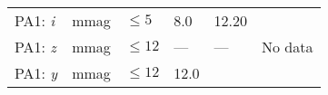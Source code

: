 \documentclass[DM,toc]{lsstdoc}
\begin{document}
\begin{longtable}[]{@{}llllll@{}}
\begin{minipage}[t]{0.14\columnwidth}
PA1: \emph{i}\strut
\end{minipage} & \begin{minipage}[t]{0.06\columnwidth}\raggedright\strut
mmag\strut
\end{minipage} & \begin{minipage}[t]{0.17\columnwidth}\raggedright\strut
\(\leq 5\)\strut
\end{minipage} & \begin{minipage}[t]{0.17\columnwidth}\raggedright\strut
8.0\strut
\end{minipage} & \begin{minipage}[t]{0.12\columnwidth}\raggedright\strut
12.20\strut
\end{minipage} & \begin{minipage}[t]{0.17\columnwidth}\raggedright\strut
\strut
\end{minipage}\tabularnewline
\begin{minipage}[t]{0.14\columnwidth}\raggedright\strut
PA1: \emph{z}\strut
\end{minipage} & \begin{minipage}[t]{0.06\columnwidth}\raggedright\strut
mmag\strut
\end{minipage} & \begin{minipage}[t]{0.17\columnwidth}\raggedright\strut
\(\leq 12\)\strut
\end{minipage} & \begin{minipage}[t]{0.17\columnwidth}\raggedright\strut
---\strut
\end{minipage} & \begin{minipage}[t]{0.12\columnwidth}\raggedright\strut
---\strut
\end{minipage} & \begin{minipage}[t]{0.17\columnwidth}\raggedright\strut
No data\strut
\end{minipage}\tabularnewline
\begin{minipage}[t]{0.14\columnwidth}\raggedright\strut
PA1: \emph{y}\strut
\end{minipage} & \begin{minipage}[t]{0.06\columnwidth}\raggedright\strut
mmag\strut
\end{minipage} & \begin{minipage}[t]{0.17\columnwidth}\raggedright\strut
\(\leq 12\)\strut
\end{minipage} & \begin{minipage}[t]{0.17\columnwidth}\raggedright\strut
12.0\strut
\end{minipage} & \begin{minipage}[t]{0.12\columnwidth}\raggedright\strut

\end{minipage}
\end{longtable}
\end{document}
